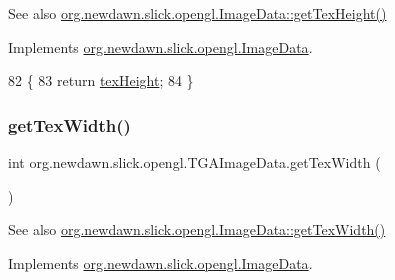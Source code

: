 \begin{DoxySeeAlso}{See also}
\mbox{\hyperlink{interfaceorg_1_1newdawn_1_1slick_1_1opengl_1_1_image_data_a316891c94ba43967d0554378c7197324}{org.\+newdawn.\+slick.\+opengl.\+Image\+Data\+::get\+Tex\+Height()}} 
\end{DoxySeeAlso}


Implements \mbox{\hyperlink{interfaceorg_1_1newdawn_1_1slick_1_1opengl_1_1_image_data_a316891c94ba43967d0554378c7197324}{org.\+newdawn.\+slick.\+opengl.\+Image\+Data}}.


\begin{DoxyCode}
82                               \{
83         \textcolor{keywordflow}{return} \mbox{\hyperlink{classorg_1_1newdawn_1_1slick_1_1opengl_1_1_t_g_a_image_data_ab5bb366dc9a1fb7d18b96e732b8a74d5}{texHeight}};
84     \}
\end{DoxyCode}
\mbox{\label{classorg_1_1newdawn_1_1slick_1_1opengl_1_1_t_g_a_image_data_a4e4b19e2ec7982442fc5086cbf7f3a30}} 
\subsubsection{\texorpdfstring{get\+Tex\+Width()}{getTexWidth()}}
{\footnotesize\ttfamily int org.\+newdawn.\+slick.\+opengl.\+T\+G\+A\+Image\+Data.\+get\+Tex\+Width (\begin{DoxyParamCaption}{ }\end{DoxyParamCaption})\hspace{0.3cm}{\ttfamily [inline]}}

\begin{DoxySeeAlso}{See also}
\mbox{\hyperlink{interfaceorg_1_1newdawn_1_1slick_1_1opengl_1_1_image_data_abf26e8dcbf2ec52f9a49535d8912263e}{org.\+newdawn.\+slick.\+opengl.\+Image\+Data\+::get\+Tex\+Width()}} 
\end{DoxySeeAlso}


Implements \mbox{\hyperlink{interfaceorg_1_1newdawn_1_1slick_1_1opengl_1_1_image_data_abf26e8dcbf2ec52f9a49535d8912263e}{org.\+newdawn.\+slick.\+opengl.\+Image\+Data}}.


